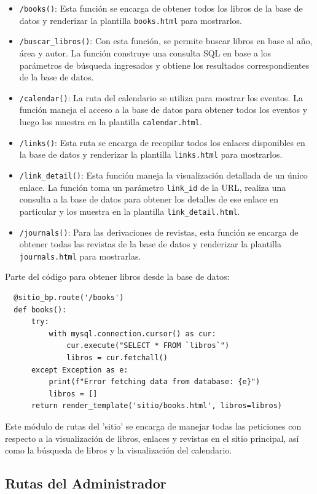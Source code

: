\documentclass[a4paper, 12pt]{book}
\begin{document}
\begin{itemize}
    \item \texttt{/books()}: Esta función se encarga de obtener todos los libros de la base de datos y renderizar la plantilla \texttt{books.html} para mostrarlos.
    \item \texttt{/buscar\_libros()}: Con esta función, se permite buscar libros en base al año, área y autor. La función construye una consulta SQL en base a los 
    parámetros de búsqueda ingresados y obtiene los resultados correspondientes de la base de datos.
    \item \texttt{/calendar()}: La ruta del calendario\cite{fullcalendar} se utiliza para mostrar los eventos. La función maneja el acceso a la base de datos para obtener todos los 
    eventos y luego los muestra en la plantilla \texttt{calendar.html}.
    \item \texttt{/links()}: Esta ruta se encarga de recopilar todos los enlaces disponibles en la base de datos y renderizar la plantilla \texttt{links.html} para mostrarlos.
    \item \texttt{/link\_detail()}: Esta función maneja la visualización detallada de un único enlace. La función toma un parámetro \texttt{link\_id} de la URL, 
    realiza una consulta a la base de datos para obtener los detalles de ese enlace en particular y los muestra en la plantilla \texttt{link\_detail.html}.
    \item \texttt{/journals()}: Para las derivaciones de revistas, esta función se encarga de obtener todas las revistas de la base de datos y renderizar la 
    plantilla \texttt{journals.html} para mostrarlas.
\end{itemize}

Parte del código para obtener libros desde la base de datos:
\begin{verbatim}
  @sitio_bp.route('/books')
  def books():
      try:
          with mysql.connection.cursor() as cur:
              cur.execute("SELECT * FROM `libros`")
              libros = cur.fetchall()
      except Exception as e:
          print(f"Error fetching data from database: {e}")
          libros = []
      return render_template('sitio/books.html', libros=libros)
\end{verbatim}
Este módulo de rutas del 'sitio' se encarga de manejar todas las peticiones con respecto a la visualización de libros, enlaces y revistas en el sitio principal, así como la búsqueda de libros y la visualización del calendario.

\subsection{Rutas del Administrador}
\label{sec:rutas_admin}
\end{document}
